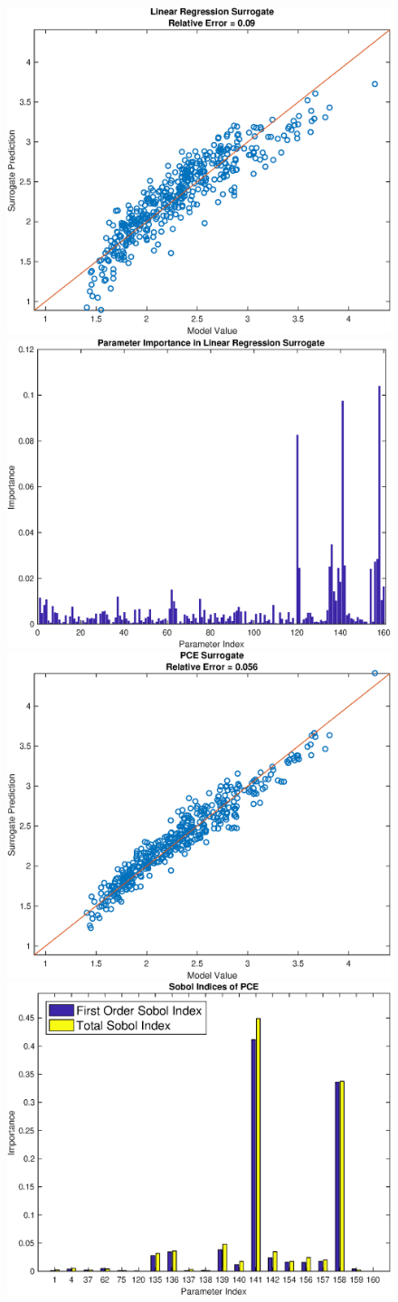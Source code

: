 \documentclass[12pt]{article}
\numberwithin{equation}{section}
\begin{document}
\begin{figure}[h]
\centering
\includegraphics[width=.49 \textwidth]{Figures/Vol_Flow_QoI_LR_Prediction_Experimental.eps}
\includegraphics[width=.49 \textwidth]{Figures/Vol_Flow_QoI_LR_VI_Experimental.eps}\\
\includegraphics[width=.49 \textwidth]{Figures/Vol_Flow_QoI_PCE_Prediction_Experimental.eps}
\includegraphics[width=.49 \textwidth]{Figures/Vol_Flow_QoI_PCE_SI_Experimental.eps}
\end{figure}
\end{document}
